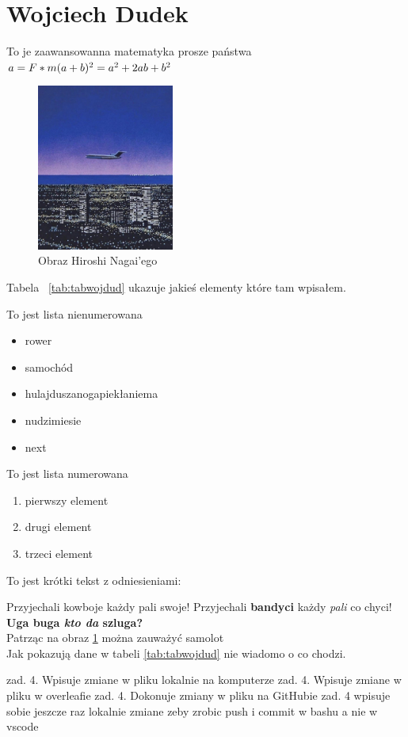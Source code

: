 \section{Wojciech Dudek}
\label{sec:wojdud}

To je zaawansowanna matematyka prosze państwa
\begin{math}
\\a = F*m
\\(a+b)^2 = a^2 + 2ab + b^2
\end{math}

\begin{figure}[htbp]
    \centering   
    \includegraphics[width=0.4\textwidth]{pictures/fotalatex.jpg}
    \caption{Obraz Hiroshi Nagai'ego}
    \label{fig:animuobrazek}
\end{figure}

Tabela ~\ref{tab:tabwojdud} ukazuje jakieś elementy które tam wpisałem.



To jest lista nienumerowana
\begin{itemize}
    \item rower
    \item samochód
    \item hulajduszanogapiekłaniema
    \item nudzimiesie
    \item next
\end{itemize}

To jest lista numerowana
\begin{enumerate}
    \item pierwszy element
    \item drugi element
    \item trzeci element
\end{enumerate}

To jest krótki tekst z odniesieniami:

Przyjechali kowboje każdy pali swoje!
Przyjechali \textbf{bandyci} każdy \textit{pali} co chyci!
\textbf{Uga buga \emph{kto da} szluga?}\\ 
Patrząc na obraz \ref{fig:animuobrazek} można zauważyć samolot\\
Jak pokazują dane w tabeli \ref{tab:tabwojdud} nie wiadomo o co chodzi.

zad. 4. Wpisuje zmiane w pliku lokalnie na komputerze
zad. 4. Wpisuje zmiane w pliku w overleafie
zad. 4. Dokonuje zmiany w pliku na GitHubie
zad. 4 wpisuje sobie jeszcze raz lokalnie zmiane zeby zrobic push i commit w bashu a nie w vscode
